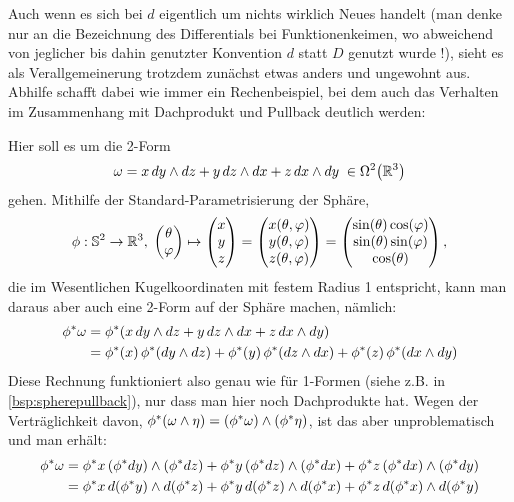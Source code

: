 \documentclass[../H_Analysis_main.tex]{subfiles}
\begin{document}
Auch wenn es sich bei $d$ eigentlich um nichts wirklich Neues handelt (man denke nur an die Bezeichnung des Differentials bei Funktionenkeimen, wo abweichend von jeglicher bis dahin genutzter Konvention $d$ statt $D$ genutzt wurde !), sieht es als Verallgemeinerung trotzdem zunächst etwas anders und ungewohnt aus. Abhilfe schafft dabei wie immer ein Rechenbeispiel, bei dem auch das Verhalten im Zusammenhang mit Dachprodukt und Pullback deutlich werden:
\begin{bsp}
Hier soll es um die 2-Form
\begin{equation}
\omega = x \, dy \wedge dz + y \, dz \wedge dx + z \, dx \wedge dy \; \in \Omega^2\qty(\mathbb{R}^3)
\end{equation}
gehen. Mithilfe der Standard-Parametrisierung der Sphäre,
\begin{equation}
\phi: \mathbb{S}^2 \rightarrow \mathbb{R}^3, \; \mqty(\theta \\ \varphi) \mapsto \mqty(x \\ y \\ z) = \mqty(x(\theta, \varphi) \\ y(\theta, \varphi) \\ z(\theta, \varphi)) = \mqty(\sin(\theta) \cos(\varphi) \\ \sin(\theta) \sin(\varphi) \\ \cos(\theta)) \, ,
\end{equation}
die im Wesentlichen Kugelkoordinaten mit festem Radius 1 entspricht, kann man daraus aber auch eine 2-Form auf der Sphäre machen, nämlich:
\begin{align*}
\phi^* \omega &= \phi^* \qty(x \, dy \wedge dz + y \, dz \wedge dx + z \, dx \wedge dy)
\\
&= \phi^*\qty(x) \, \phi^*\qty(dy \wedge dz) + \phi^*\qty(y) \, \phi^*\qty(dz \wedge dx) + \phi^*\qty(z) \, \phi^*\qty(dx \wedge dy)
\end{align*}
Diese Rechnung funktioniert also genau wie für 1-Formen (siehe z.B. in \ref{bsp:spherepullback}), nur dass man hier noch Dachprodukte hat. Wegen der Verträglichkeit davon, $\phi^*\qty(\omega \wedge \eta) = \qty(\phi^* \omega) \wedge \qty(\phi^* \eta)$, ist das aber unproblematisch und man erhält:
\begin{align*}
\phi^* \omega &=  \phi^*x \, \qty(\phi^* dy) \wedge \qty(\phi^*dz) + \phi^*y \, \qty(\phi^* dz) \wedge \qty(\phi^* dx) + \phi^*z \, \qty(\phi^* dx) \wedge \qty(\phi^* dy)
\\
&= \phi^*x \, d\qty(\phi^* y) \wedge d\qty(\phi^*z) + \phi^*y \, d\qty(\phi^* z) \wedge d\qty(\phi^* x) + \phi^*z \, d\qty(\phi^* x) \wedge d\qty(\phi^* y)

\end{align*}
\end{bsp}
\end{document}
